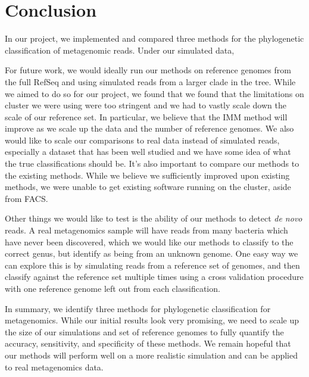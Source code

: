 \documentclass[12pt]{article} %
\begin{document}
\section{Conclusion}
In our project, we implemented and compared three methods for the phylogenetic classification of metagenomic reads. Under our simulated data, 
\par
For future work, we would ideally run our methods on reference genomes from the full RefSeq and using simulated reads from a larger clade in the tree. While we aimed to do so for our project, we found that we found that the limitations on cluster we were using were too stringent and we had to vastly scale down the scale of our reference set. In particular, we believe that the IMM method will improve as we scale up the data and the number of reference genomes. We also would like to scale our comparisons to real data instead of simulated reads, especially a dataset that has been well studied and we have some idea of what the true classifications should be. It's also important to compare our methods to the existing methods. While we believe we sufficiently improved upon existing methods, we were unable to get existing software running on the cluster, aside from FACS. 
\par
Other things we would like to test is the ability of our methods to detect \emph{de novo} reads. A real metagenomics sample will have reads from many bacteria which have never been discovered, which we would like our methods to classify to the correct genus, but identify as being from an unknown genome. One easy way we can explore this is by simulating reads from a reference set of genomes, and then classify against the reference set multiple times using a cross validation procedure with one reference genome left out from each classification.
\par
In summary, we identify three methods for phylogenetic classification for metagenomics. While our initial results  look very promising, we need to scale up the size of our simulations and set of reference genomes to fully quantify the accuracy, sensitivity, and specificity of these methods. We remain hopeful that our methods will perform well on a more realistic simulation and can be applied to real metagenomics data. 

\end{document}
